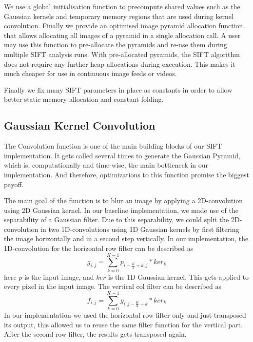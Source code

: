 \documentclass[letterpaper]{article}
\begin{document}
We use a global initialisation function to precompute shared values such as the Gaussian kernels and temporary memory regions that are used during kernel convolution. Finally we provide an optimised image pyramid allocation function that allows allocating all images of a pyramid in a single allocation call. A user may use this function to pre-allocate the pyramids and re-use them during multiple SIFT analysis runs. With pre-allocated pyramids, the SIFT algorithm does not require any further heap allocations during execution. This makes it much cheaper for use in continuous image feeds or videos.

Finally we fix many SIFT parameters in place as constants in order to allow better static memory allocation and constant folding.


\subsection*{Gaussian Kernel Convolution}
The Convolution function is one of the main building blocks of our SIFT implementation. It gets called several times to generate the Gaussian Pyramid, which is, computationally and time-wise, the main bottleneck in our implementation. And therefore, optimizations to this function promise the biggest payoff.

The main goal of the function is to blur an image by applying a 2D-convolution using 2D Gaussian kernel. In our baseline implementation, we made use of the separability of a Gaussian filter. Due to this separability, we could split the 2D-convolution in two 1D-convolutions using 1D Gaussian kernels by first filtering the image horizontally and in a second step vertically. In our implementation, the 1D-convolution for the horizontal row filter can be described as
\begin{equation}\label{eq_h}
    g_{i,j} = \sum_{k=0}^{K-1} p_{i-\frac{K}{2}+k,j} * ker_{k}
\end{equation}
here $p$ is the input image, and $ker$ is the 1D Gaussian kernel. This gets applied to every pixel in the input image. The vertical col filter can be described as
\begin{equation}\label{eq_v}
    f_{i,j} = \sum_{k=0}^{K-1} g_{i,j-\frac{K}{2}+k} * ker_{k}
\end{equation}
In our implementation we used the horizontal row filter only and just transposed its output, this allowed us to reuse the same filter function for the vertical part. After the second row filter, the results gets transposed again.
\end{document}
